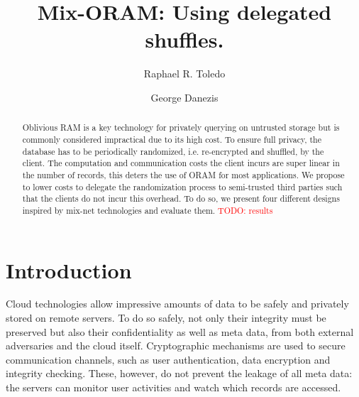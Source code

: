 \documentclass[USenglish,oneside,twocolumn]{article}
\newcommand{\todo}[1]{\textcolor{red}{TODO: #1}}
\begin{document}
 
\author[1]{Raphael R. Toledo}

\author[2]{George Danezis}



  \title{Mix-ORAM: Using delegated shuffles.}

  \begin{abstract}
{
Oblivious RAM is a key technology for privately querying on untrusted storage but is commonly considered impractical due to its high cost. To ensure full privacy, the database has to be periodically randomized, i.e. re-encrypted and shuffled, by the client. The computation and communication costs the client incurs are super linear in the number of records, this deters the use of ORAM for most applications. We propose to lower costs to delegate the randomization process to semi-trusted third parties such that the clients do not incur this overhead. To do so, we present four different designs inspired by mix-net technologies and evaluate them. \todo{results}
}
\end{abstract}



\maketitle
%
\section{Introduction}\label{Introduction}
%

Cloud technologies allow impressive amounts of data to be safely and privately stored on remote servers. To do so safely, not only their integrity must be preserved but also their confidentiality as well as meta data, from both external adversaries and the cloud itself.
Cryptographic mechanisms are used to secure communication channels, such as user authentication, data encryption and integrity checking.
These, however, do not prevent the leakage of all meta data: the servers can monitor user activities and watch which records are accessed. \\
\end{document}
